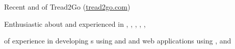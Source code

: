 

\begin{cvparagraph}
        \begin{summaryitems}
            \item \begin{center} Recent  and  of Tread2Go (\underline{\href{https://www.tread2go.com}{tread2go.com}}) \end{center}
            \item \begin{center} Enthusiastic about and experienced in , , , , ,  \end{center}
            \item \begin{center}  of experience in developing s using  and  and web applications using ,  and  \end{center}
        \end{summaryitems}
\end{cvparagraph}


\vspace{-3mm}
